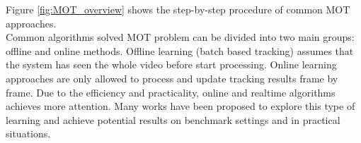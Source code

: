 Figure \ref{fig:MOT_overview} shows the step-by-step procedure of common MOT approaches.\\
Common algorithms solved MOT problem can be divided into two main groups: offline and online methods. 
Offline learning (batch based tracking) \cite{rezatofighi2015joint,kim2015multiple} assumes that the system has seen the whole video before start processing. 
Online learning approaches are only allowed to process and update tracking results frame by frame. Due to the efficiency and practicality, online and realtime algorithms achieves more attention. Many works \cite{pang2021quasi, zhou2020tracking, bergmann2019tracking, wojke2017simple} have been proposed to explore this type of learning and achieve potential results on benchmark settings and in practical situations. 

